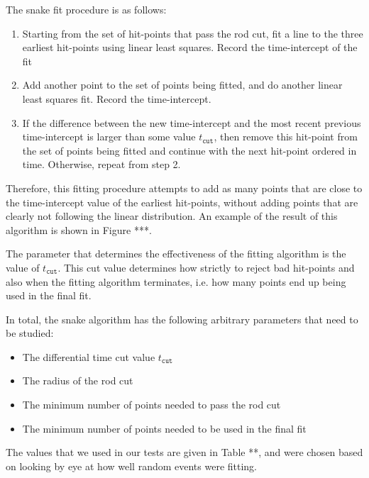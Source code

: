 \documentclass[12pt,twoside,letterpaper]{article}
\begin{document}
The snake fit procedure is as follows:

\begin{enumerate}
\item Starting from the set of hit-points that pass the rod cut, fit a line to the three earliest hit-points using linear least squares. Record the time-intercept of the fit
\item Add another point to the set of points being fitted, and do another linear least squares fit. Record the time-intercept. 
\item If the difference between the new time-intercept and the most recent previous time-intercept is larger than some value $t_{\texttt{cut}}$, then remove this hit-point from the set of points being fitted and continue with the next hit-point ordered in time. Otherwise, repeat from step 2. 
\end{enumerate}

Therefore, this fitting procedure attempts to add as many points that are close to the time-intercept value of the earliest hit-points, without adding points that are clearly not following the linear distribution. An example of the result of this algorithm is shown in Figure ***. 

The parameter that determines the effectiveness of the fitting algorithm is the value of $t_{\texttt{cut}}$. This cut value determines how strictly to reject bad hit-points and also when the fitting algorithm terminates, i.e. how many points end up being used in the final fit. 

In total, the snake algorithm has the following arbitrary parameters that need to be studied:
\begin{itemize}
\item The differential time cut value $t_{\texttt{cut}}$
\item The radius of the rod cut
\item The minimum number of points needed to pass the rod cut
\item The minimum number of points needed to be used in the final fit
\end{itemize}

The values that we used in our tests are given in Table **, and were chosen based on looking by eye at how well random events were fitting. 
\end{document}
